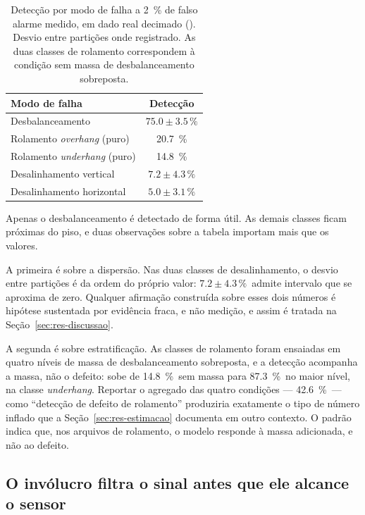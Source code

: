 \begin{table}[!htb]
\centering
\caption{Detecção por modo de falha a \SI{2}{\percent} de falso alarme medido, em dado
real decimado (\pM). Desvio entre partições onde registrado. As duas classes de rolamento
correspondem à condição sem massa de desbalanceamento sobreposta.}
\label{tab:deteccao}
\small
\begin{tabular}{lc}
\toprule
Modo de falha & Detecção \\
\midrule
Desbalanceamento                      & $\num{75,0} \pm \num{3,5}\,\si{\percent}$ \\
Rolamento \emph{overhang} (puro)      & \SI{20,7}{\percent} \\
Rolamento \emph{underhang} (puro)     & \SI{14,8}{\percent} \\
Desalinhamento vertical               & $\num{7,2} \pm \num{4,3}\,\si{\percent}$ \\
Desalinhamento horizontal             & $\num{5,0} \pm \num{3,1}\,\si{\percent}$ \\
\bottomrule
\end{tabular}
\end{table}

Apenas o desbalanceamento é detectado de forma útil. As demais classes ficam próximas do
piso, e duas observações sobre a tabela importam mais que os valores.

A primeira é sobre a dispersão. Nas duas classes de desalinhamento, o desvio entre
partições é da ordem do próprio valor: $\num{7,2} \pm \num{4,3}\,\si{\percent}$\pM\
admite intervalo que se aproxima de zero. Qualquer afirmação construída sobre esses dois
números é hipótese sustentada por evidência fraca, e não medição, e assim é tratada na
Seção~\ref{sec:res-discussao}.

A segunda é sobre estratificação. As classes de rolamento foram ensaiadas em quatro níveis
de massa de desbalanceamento sobreposta, e a detecção acompanha a massa, não o defeito:
sobe de \SI{14,8}{\percent}\pM\ sem massa para \SI{87,3}{\percent}\pM\ no maior nível, na
classe \emph{underhang}. Reportar o agregado das quatro condições --- \SI{42,6}{\percent}\pM\
--- como ``detecção de defeito de rolamento'' produziria exatamente o tipo de número
inflado que a Seção~\ref{sec:res-estimacao} documenta em outro contexto. O padrão indica
que, nos arquivos de rolamento, o modelo responde à massa adicionada, e não ao defeito.

\subsection{O invólucro filtra o sinal antes que ele alcance o sensor}

